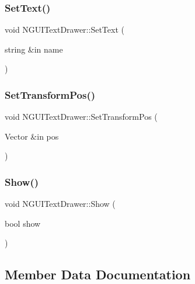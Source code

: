 \subsubsection{\texorpdfstring{Set\+Text()}{SetText()}}
{\footnotesize\ttfamily void N\+G\+U\+I\+Text\+Drawer\+::\+Set\+Text (\begin{DoxyParamCaption}\item[{string \&in}]{name }\end{DoxyParamCaption})}

\hypertarget{class_n_g_u_i_text_drawer_ad865297363a8cb996897bca6c9169ac0}{}\label{class_n_g_u_i_text_drawer_ad865297363a8cb996897bca6c9169ac0} 
\subsubsection{\texorpdfstring{Set\+Transform\+Pos()}{SetTransformPos()}}
{\footnotesize\ttfamily void N\+G\+U\+I\+Text\+Drawer\+::\+Set\+Transform\+Pos (\begin{DoxyParamCaption}\item[{Vector \&in}]{pos }\end{DoxyParamCaption})}

\hypertarget{class_n_g_u_i_text_drawer_a80ecbfada6e99304c0068187eacf8a32}{}\label{class_n_g_u_i_text_drawer_a80ecbfada6e99304c0068187eacf8a32} 
\subsubsection{\texorpdfstring{Show()}{Show()}}
{\footnotesize\ttfamily void N\+G\+U\+I\+Text\+Drawer\+::\+Show (\begin{DoxyParamCaption}\item[{bool}]{show }\end{DoxyParamCaption})}



\subsection{Member Data Documentation}
\hypertarget{class_n_g_u_i_text_drawer_af2ba553969c90c36d9bde4a5cd7aff6f}{}\label{class_n_g_u_i_text_drawer_af2ba553969c90c36d9bde4a5cd7aff6f} 
